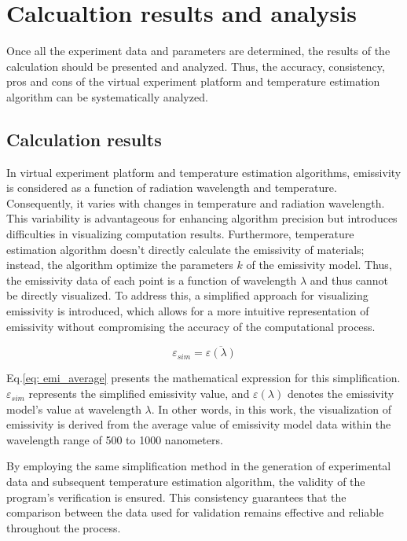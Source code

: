 \chapter{Calcualtion results and analysis}
Once all the experiment data and parameters are determined, the results 
of the calculation should be presented and analyzed. Thus, the 
accuracy, consistency, pros and cons of the virtual experiment 
platform and temperature estimation algorithm can be systematically 
analyzed.

\section{Calculation results}
In virtual experiment platform and temperature estimation algorithms, emissivity is considered as a 
function of radiation wavelength and temperature. Consequently, it varies with changes in 
temperature and radiation wavelength. This variability is advantageous for enhancing algorithm 
precision but introduces difficulties in visualizing computation results. Furthermore, 
temperature estimation algorithm doesn't directly calculate the emissivity of materials; 
instead, the algorithm optimize the parameters $k$ of the emissivity model. 
Thus, the emissivity data of each point is a function of wavelength $\lambda$ and thus
cannot be directly visualized. To address this, a simplified 
approach for visualizing emissivity is introduced, which allows for a more intuitive 
representation of emissivity without compromising the accuracy of the computational process.

\begin{equation}
    \label{eq: emi_average}
    \varepsilon_{sim} = \overline{\varepsilon(\lambda)} 
\end{equation}

Eq.\ref{eq: emi_average} presents the mathematical expression for this simplification. 
$\varepsilon_{sim}$ represents the simplified emissivity value, and $\varepsilon(\lambda)$ denotes 
the emissivity model's value at wavelength $\lambda$. In other words, in this work, the 
visualization of emissivity is derived from the average value of emissivity model data 
within the wavelength range of 500 to 1000 nanometers.


By employing the same simplification method in the generation of experimental data and 
subsequent temperature estimation algorithm, the validity of the program's verification is 
ensured. This consistency guarantees that the comparison between the data used for 
validation remains effective and reliable throughout the process.


